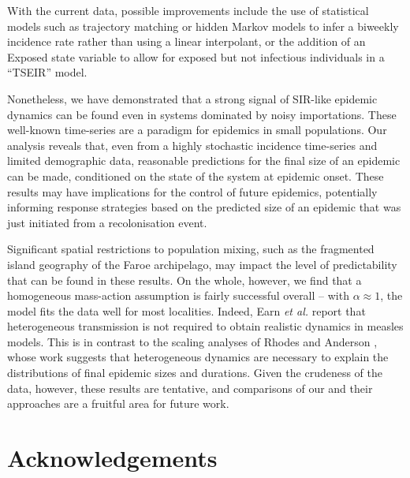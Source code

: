 \documentclass[10pt]{article}
\begin{document}
With the current data, possible improvements include the use of statistical models such as trajectory matching or hidden Markov models to infer a biweekly incidence rate rather than using a linear interpolant, or the addition of an Exposed state variable to allow for exposed but not infectious individuals in a ``TSEIR'' model. 

Nonetheless, we have demonstrated that a strong signal of SIR-like epidemic dynamics can be found even in systems dominated by noisy importations. These well-known time-series \cite{Cliff1981, Cliff2000} are a paradigm for epidemics in small populations. Our analysis reveals that, even from a highly stochastic incidence time-series and limited demographic data, reasonable predictions for the final size of an epidemic can be made, conditioned on the state of the system at epidemic onset. These results may have implications for the control of future epidemics, potentially informing response strategies based on the predicted size of an epidemic that was just initiated from a recolonisation event.

Significant spatial restrictions to population mixing, such as the fragmented island geography of the Faroe archipelago, may impact the level of predictability that can be found in these results. On the whole, however, we find that a homogeneous mass-action assumption is fairly successful overall -- with $\alpha \approx 1$, the model fits the data well for most localities. Indeed, Earn \textit{et al.} \cite{Earn2000} report that heterogeneous transmission is not required to obtain realistic dynamics in measles models. This is in contrast to the scaling analyses of Rhodes and Anderson \cite{Rhodes1996a, Rhodes1996b}, whose work suggests that heterogeneous dynamics are necessary to explain the distributions of final epidemic sizes and durations. Given the crudeness of the data, however, these results are tentative, and comparisons of our and their approaches are a fruitful area for future work.
























\section*{Acknowledgements}
\end{document}
